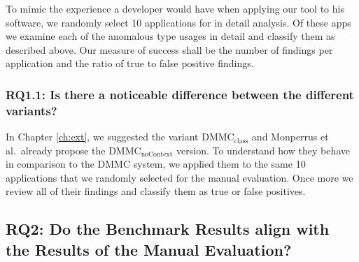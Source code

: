 To mimic the experience a developer would have when applying our tool to his software, we randomly select 10 applications for in detail analysis.
Of these apps we examine each of the anomalous type usages in detail and classify them as described above.
Our measure of success shall be the number of findings per application and the ratio of true to false positive findings.


\subsubsection{RQ1.1: Is there a noticeable difference between the different variants?}

In Chapter \ref{ch:ext}, we suggested the variant $\text{DMMC}_\text{class}$ and Monperrus et al.\ already propose the $\text{DMMC}_\text{noContext}$ version.
To understand how they behave in comparison to the $\text{DMMC}$ system, we applied them to the same 10 applications that we randomly selected for the manual evaluation.
Once more we review all of their findings and classify them as true or false positives.



\subsection{RQ2: Do the Benchmark Results align with the Results of the Manual Evaluation?}

